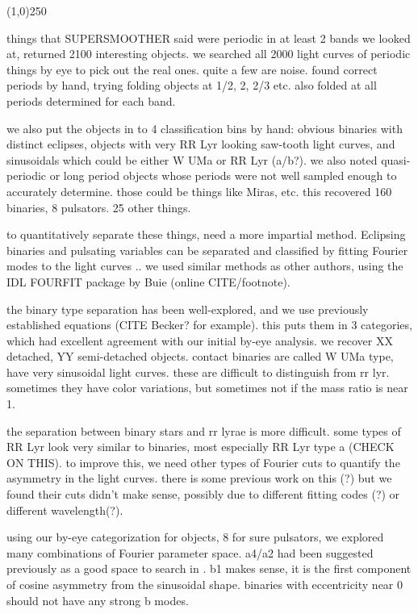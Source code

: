 \documentclass[]{emulateapj}
\begin{document}
\begin{center}
{\color{red} \line(1,0){250}}
\end{center}

things that SUPERSMOOTHER said were periodic in at least 2 bands we looked at, returned 2100 interesting objects. we searched all 2000 light curves of periodic things by eye to pick out the real ones. quite a few are noise. found correct periods by hand, trying folding objects at 1/2, 2, 2/3 etc. also folded at all periods determined for each band.  

we also put the objects in to 4 classification bins by hand: obvious binaries with distinct eclipses, objects with very RR Lyr looking saw-tooth light curves, and sinusoidals which could be either W UMa or RR Lyr (a/b?). we also noted quasi-periodic or long period objects whose periods were not well sampled enough to accurately determine. those could be things like Miras, etc. this recovered 160 binaries, 8 pulsators. 25 other things.


to quantitatively separate these things, need a more impartial method. Eclipsing binaries and pulsating variables can be separated and classified by fitting Fourier modes to the light curves \citep{pojmanski2002,nefs2012}.. we used similar methods as other authors, using the IDL FOURFIT package by Buie (online CITE/footnote).


the binary type separation has been well-explored, and we use previously established equations (CITE Becker? for example). this puts them in 3 categories, which had excellent agreement with our initial by-eye analysis. we recover XX detached, YY semi-detached objects. contact binaries are called W UMa type, have very sinusoidal light curves. these are difficult to distinguish from rr lyr. sometimes they have color variations, but sometimes not if the mass ratio is near 1.

the separation between binary stars and rr lyrae is more difficult. some types of RR Lyr look very similar to binaries, most especially RR Lyr type a (CHECK ON THIS).  to improve this, we need other types of Fourier cuts to quantify the asymmetry in the light curves. there is some previous work on this (\citep{aaas}?) but we found their cuts didn't make sense, possibly due to different fitting codes (?) or different wavelength(?). 

using our by-eye categorization for objects, 8 for sure pulsators, we explored many combinations of Fourier parameter space. a4/a2 had been suggested previously as a good space to search in \citep{asas}. b1 makes sense, it is the first component of cosine asymmetry from the sinusoidal shape. binaries with eccentricity near 0 should not have any strong b modes. 
\end{document}

